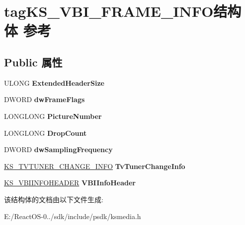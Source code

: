 \hypertarget{structtag_k_s___v_b_i___f_r_a_m_e___i_n_f_o}{}\section{tag\+K\+S\+\_\+\+V\+B\+I\+\_\+\+F\+R\+A\+M\+E\+\_\+\+I\+N\+F\+O结构体 参考}
\label{structtag_k_s___v_b_i___f_r_a_m_e___i_n_f_o}
\subsection*{Public 属性}
\begin{DoxyCompactItemize}
\item 
\mbox{\label{structtag_k_s___v_b_i___f_r_a_m_e___i_n_f_o_a42566ef5e7c61900b52aeed3ca15149b}} 
U\+L\+O\+NG {\bfseries Extended\+Header\+Size}
\item 
\mbox{\label{structtag_k_s___v_b_i___f_r_a_m_e___i_n_f_o_ae8ca9d7da7efe2f809eadd86ae5075ca}} 
D\+W\+O\+RD {\bfseries dw\+Frame\+Flags}
\item 
\mbox{\label{structtag_k_s___v_b_i___f_r_a_m_e___i_n_f_o_a0aa01468b10fe93640baeaa8ee391cab}} 
L\+O\+N\+G\+L\+O\+NG {\bfseries Picture\+Number}
\item 
\mbox{\label{structtag_k_s___v_b_i___f_r_a_m_e___i_n_f_o_a207b6c8ff74cfd8f5df3f383abd673bc}} 
L\+O\+N\+G\+L\+O\+NG {\bfseries Drop\+Count}
\item 
\mbox{\label{structtag_k_s___v_b_i___f_r_a_m_e___i_n_f_o_a2c58c23989c86a6e983da1deb54c607a}} 
D\+W\+O\+RD {\bfseries dw\+Sampling\+Frequency}
\item 
\mbox{\label{structtag_k_s___v_b_i___f_r_a_m_e___i_n_f_o_a4d045870a25d0cab8aabb42d69b9c026}} 
\hyperlink{structtag_k_s___t_v_t_u_n_e_r___c_h_a_n_g_e___i_n_f_o}{K\+S\+\_\+\+T\+V\+T\+U\+N\+E\+R\+\_\+\+C\+H\+A\+N\+G\+E\+\_\+\+I\+N\+FO} {\bfseries Tv\+Tuner\+Change\+Info}
\item 
\mbox{\label{structtag_k_s___v_b_i___f_r_a_m_e___i_n_f_o_a83deebc767f643043aee6711b272b7bb}} 
\hyperlink{structtag_k_s___v_b_i_i_n_f_o_h_e_a_d_e_r}{K\+S\+\_\+\+V\+B\+I\+I\+N\+F\+O\+H\+E\+A\+D\+ER} {\bfseries V\+B\+I\+Info\+Header}
\end{DoxyCompactItemize}


该结构体的文档由以下文件生成\+:\begin{DoxyCompactItemize}
\item 
E\+:/\+React\+O\+S-\/0../sdk/include/psdk/ksmedia.\+h\end{DoxyCompactItemize}
